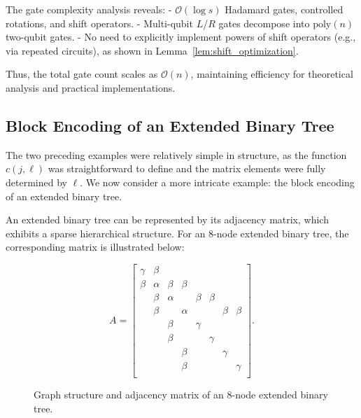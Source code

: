 \documentclass{article}
\begin{document}
The gate complexity analysis reveals:
- $\mathcal{O}(\log s)$ Hadamard gates, controlled rotations, and shift operators.
- Multi-qubit $L$/$R$ gates decompose into $\mathrm{poly}(n)$ two-qubit gates.
- No need to explicitly implement powers of shift operators (e.g., via repeated circuits), as shown in Lemma~\ref{lem:shift_optimization}.

Thus, the total gate count scales as $\mathcal{O}(n)$, maintaining efficiency for theoretical analysis and practical implementations.

\subsection{Block Encoding of an Extended Binary Tree}

The two preceding examples were relatively simple in structure, as the function $c(j, \ell)$ was straightforward to define and the matrix elements were fully determined by $\ell$. We now consider a more intricate example: the block encoding of an extended binary tree.

An extended binary tree can be represented by its adjacency matrix, which exhibits a sparse hierarchical structure. For an 8-node extended binary tree, the corresponding matrix is illustrated below:

\begin{figure}[htbp]
  \centering
  \begin{minipage}{0.35\textwidth}
    \centering
  \end{minipage}
  \hfill
  \begin{minipage}{0.6\textwidth}
    \centering
    \begin{equation}
      A =
      \begin{bmatrix}
        \gamma & \beta \\
        \beta & \alpha & \beta & \beta \\
        & \beta & \alpha & & \beta & \beta \\
        & \beta & & \alpha & & & \beta & \beta  \\
        & & \beta & & \gamma \\
        & & \beta & & & \gamma \\
        & & & \beta & & & \gamma \\
        &       & & \beta  & & &       & \gamma \\
      \end{bmatrix}.
    \end{equation}
  \end{minipage}
  \caption{Graph structure and adjacency matrix of an 8-node extended binary tree.}
  \label{fig:figure}
\end{figure}
\end{document}
